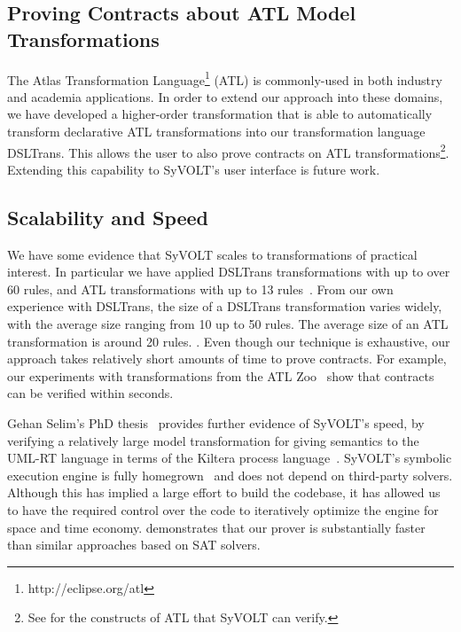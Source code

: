 \subsection{Proving Contracts about ATL Model Transformations}
The Atlas Transformation Language\footnote{http://eclipse.org/atl} (ATL) is
commonly-used in both industry and academia applications. In order to extend our approach into these domains, we
have developed a higher-order transformation that is able to automatically
transform declarative ATL transformations into our transformation language
DSLTrans. This allows the user to also prove contracts on ATL transformations\footnote{See \cite{Oakes} for the
constructs of ATL that SyVOLT can verify.}. Extending this capability to SyVOLT's user interface is
future work.

\subsection{Scalability and Speed}

We have some evidence that SyVOLT scales to transformations of practical
interest. In particular we have applied DSLTrans transformations with up to
over 60 rules, and ATL transformations with up to 13 rules~\cite{Oakes}. From our own
experience with DSLTrans, the size of a DSLTrans transformation varies widely,
with the average size ranging from 10 up to 50 rules. The average size of an ATL
transformation is around 20 rules. .
Even though our technique is exhaustive, our approach takes relatively short
amounts of time to prove contracts. For example, our experiments with
transformations from the ATL Zoo~\cite{Oakes} show that contracts can be verified within seconds.

Gehan Selim's PhD thesis~\cite{Selim2015} provides further evidence of SyVOLT's speed, by verifying a relatively large model transformation
for giving semantics to the UML-RT language in terms of the Kiltera process
language~\cite{PosseDingel2014}. SyVOLT's symbolic execution engine is fully
homegrown~\cite{LucioVang} and does not depend on third-party solvers. Although
this has implied a large effort to build the codebase, it has allowed us to
have the required control over the code to iteratively optimize the engine for
space and time economy.
\cite{Selim2014} demonstrates that our prover is substantially faster than
similar approaches based on SAT solvers.








